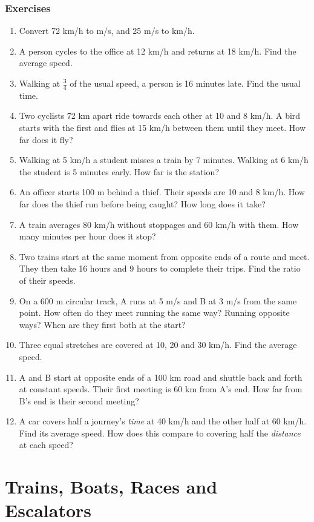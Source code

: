 \documentclass[11pt,a4paper,openany]{report}
\newenvironment{exercises}{\subsection*{Exercises \thechapter}\begin{enumerate}[label=\textbf{\thechapter.\arabic*},leftmargin=3.2em]}{\end{enumerate}}
\begin{document}
\begin{exercises}
\item Convert 72 km/h to m/s, and 25 m/s to km/h.
\item A person cycles to the office at 12 km/h and returns at 18 km/h. Find the average speed.
\item Walking at $\frac34$ of the usual speed, a person is 16 minutes late. Find the usual time.
\item Two cyclists 72 km apart ride towards each other at 10 and 8 km/h. A bird starts with the first and flies at 15 km/h between them until they meet. How far does it fly?
\item Walking at 5 km/h a student misses a train by 7 minutes. Walking at 6 km/h the student is 5 minutes early. How far is the station?
\item An officer starts 100 m behind a thief. Their speeds are 10 and 8 km/h. How far does the thief run before being caught? How long does it take?
\item A train averages 80 km/h without stoppages and 60 km/h with them. How many minutes per hour does it stop?
\item Two trains start at the same moment from opposite ends of a route and meet. They then take 16 hours and 9 hours to complete their trips. Find the ratio of their speeds.
\item On a 600 m circular track, A runs at 5 m/s and B at 3 m/s from the same point. How often do they meet running the same way? Running opposite ways? When are they first both at the start?
\item Three equal stretches are covered at 10, 20 and 30 km/h. Find the average speed.
\item A and B start at opposite ends of a 100 km road and shuttle back and forth at constant speeds. Their first meeting is 60 km from A's end. How far from B's end is their second meeting?
\item A car covers half a journey's \emph{time} at 40 km/h and the other half at 60 km/h. Find its average speed. How does this compare to covering half the \emph{distance} at each speed?
\end{exercises}

\chapter{Trains, Boats, Races and Escalators}\label{ch:trains}
\end{document}
